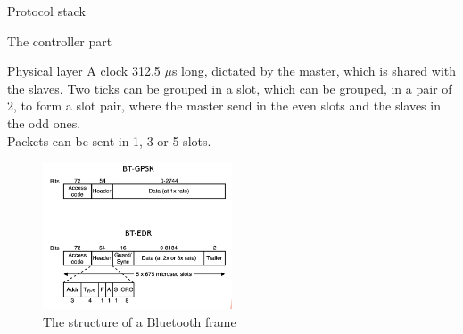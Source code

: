 \begin{section}{Protocol stack}
\begin{subsection}{The controller part}
\begin{subsubsection}{Physical layer}
    A clock 312.5 $\mu$s long, dictated by the master, which is shared with the slaves.
    Two ticks can be grouped in a slot, which can be grouped, in a pair of 2, to form a slot pair,
    where the master send in the even slots and the slaves in the odd ones.\\
    Packets can be sent in 1, 3 or 5 slots.

    \begin{figure}[H]
      \centering
      \includegraphics[width=0.5\textwidth]{img/wireless/bluetooth frame.png}
      \caption{The structure of a Bluetooth frame}
    \end{figure}
    \end{subsubsection}

  \end{subsection}
\end{section}

